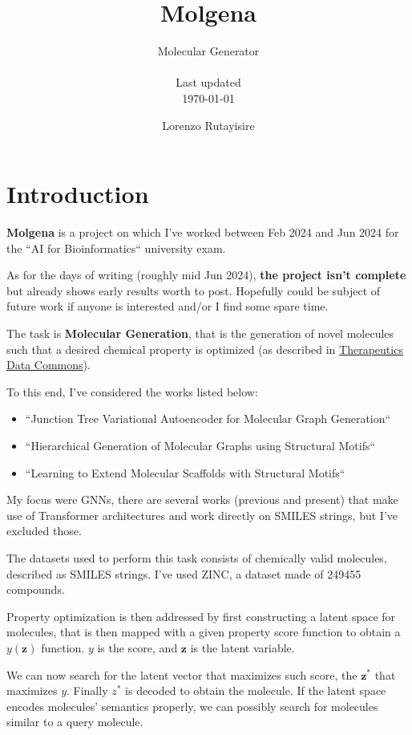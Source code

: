 \documentclass{article}
\title{Molgena}
\subtitle{Molecular Generator\\
\\
Last updated\\
\today
}
\author{Lorenzo Rutayisire}
\begin{document}
\maketitle
\tableofcontents

\section{Introduction}

\textbf{Molgena} is a project on which I've worked between Feb 2024 and Jun 2024 for the ``AI for Bioinformatics`` university exam.

As for the days of writing (roughly mid Jun 2024), \textbf{the project isn't complete} but already shows early results worth to post.
Hopefully could be subject of future work if anyone is interested and/or I find some spare time.

The task is \textbf{Molecular Generation}, that is the generation of novel molecules such that a desired chemical property is optimized
(as described in \href{https://tdcommons.ai/generation_tasks/molgen/}{Therapeutics Data Commons}).

To this end, I've considered the works listed below:

\begin{itemize}
\item ``Junction Tree Variational Autoencoder for Molecular Graph Generation`` \cite{jtvae2019}
\item ``Hierarchical Generation of Molecular Graphs using Structural Motifs`` \cite{hievae2020}
\item ``Learning to Extend Molecular Scaffolds with Structural Motifs`` \cite{microsoft2024}
\end{itemize}

My focus were GNNs, there are several works (previous and present) that make use of Transformer architectures and work directly on SMILES strings, but I've excluded those.

The datasets used to perform this task consists of chemically valid molecules, described as SMILES
strings. I've used ZINC, a dataset made of 249455 compounds.

Property optimization is then addressed by first constructing a latent space for molecules, that is then mapped with a given property score function to obtain a $y(\boldsymbol{z})$ function.
$y$ is the score, and $\boldsymbol{z}$ is the latent variable.

We can now search for the latent vector that maximizes such score, the $\boldsymbol{z^*}$ that maximizes $y$.
Finally $z^*$ is decoded to obtain the molecule.
If the latent space encodes molecules' semantics properly, we can possibly search for molecules similar to a query molecule.
\end{document}
